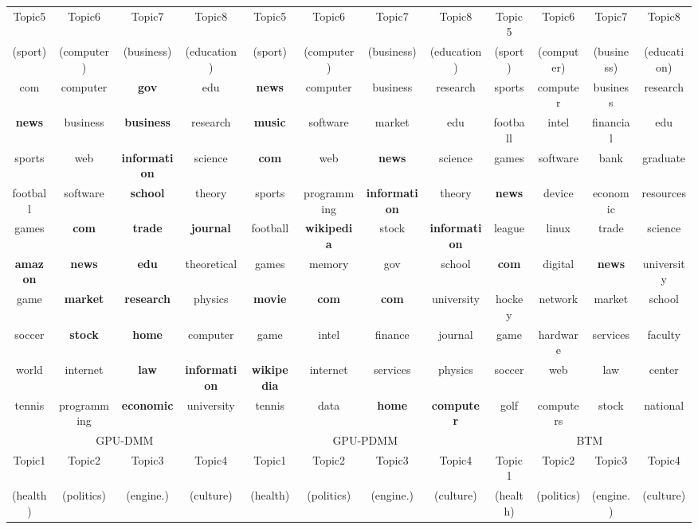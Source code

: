 \documentclass[10pt,journal,compsoc]{IEEEtran}
\begin{document}
{\begin{table}
{\begin{tabular}{|cccc|cccc|cccc|}
    \hline
    {Topic5}&{Topic6}&{Topic7}&{Topic8}&{Topic5}&{Topic6}&{Topic7}&{Topic8}&{Topic5}&{Topic6}&{Topic7}&{Topic8}\\
    {(sport)}&{(computer)}&{(business)}&{(education)}&{(sport)}&{(computer)}&{(business)}&{(education)}&{(sport)}&{(computer)}&{(business)}&{(education)}\\
    \hline
    {com}&{computer}&\textbf{gov}&{edu}&\textbf{news}&{computer}&{business}&{research}&{sports}&{computer}&{business}&{research}\\
    \textbf{news}&{business}&\textbf{business}&{research}&{\textbf{music}}&{software}&{market}&{edu}&{football}&{intel}&{financial}&{edu}\\
    {sports}&{web}&\textbf{information}&{science}&\textbf{com}&{web}&\textbf{news}&{science}&{games}&{software}&{bank}&{graduate}\\
    {football}&{software}&{\textbf{school}}&{theory}&{sports}&{programming}&\textbf{information}&{theory}&\textbf{news}&{device}&{economic}&{resources}\\
    {games}&\textbf{com}&\textbf{trade}&{\textbf{journal}}&{football}&\textbf{wikipedia}&{stock}&\textbf{information}&{league}&{linux}&{trade}&{science}\\
    {\textbf{amazon}}&\textbf{news}&{\textbf{edu}}&{theoretical}&{games}&{memory}&{gov}&{school}&\textbf{com}&{digital}&\textbf{news}&{university}\\
    {game}&{\textbf{market}}&\textbf{research}&{physics}&{\textbf{movie}}&\textbf{com}&\textbf{com}&{university}&{hockey}&{network}&{market}&{school}\\
    {soccer}&{\textbf{stock}}&\textbf{home}&{computer}&{game}&{intel}&{finance}&{journal}&{game}&{hardware}&{services}&{faculty}\\
    {world}&{internet}&\textbf{law}&\textbf{information}&{\textbf{wikipedia}}&{internet}&{services}&{physics}&{soccer}&{web}&{law}&{center}\\
    {tennis}&{programming}&\textbf{economic}&{university}&{tennis}&{data}&{\textbf{home}}&\textbf{computer}&{golf}&{computers}&{stock}&{national}\\
    \hline
    \multicolumn{4}{|c|}{GPU-DMM}&\multicolumn{4}{|c|}{GPU-PDMM}&\multicolumn{4}{|c|}{BTM}\\
    \hline
    {Topic1}&{Topic2}&{Topic3}&{Topic4}&{Topic1}&{Topic2}&{Topic3}&{Topic4}&{Topic1}&{Topic2}&{Topic3}&{Topic4}\\
    {(health)}&{(politics)}&{(engine.)}&{(culture)}&{(health)}&{(politics)}&{(engine.)}&{(culture)}&{(health)}&{(politics)}&{(engine.)}&{(culture)}\\

\end{tabular}}
\end{table}}
\end{document}
